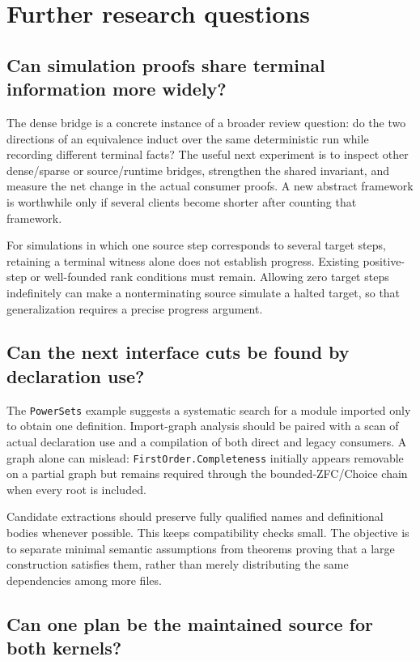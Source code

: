 \documentclass[11pt]{article}
\begin{document}
\section{Further research questions}

\subsection{Can simulation proofs share terminal information more widely?}

The dense bridge is a concrete instance of a broader review question: do the two directions of an equivalence induct over the same deterministic run while recording different terminal facts? The useful next experiment is to inspect other dense/sparse or source/runtime bridges, strengthen the shared invariant, and measure the net change in the actual consumer proofs. A new abstract framework is worthwhile only if several clients become shorter after counting that framework.

For simulations in which one source step corresponds to several target steps, retaining a terminal witness alone does not establish progress. Existing positive-step or well-founded rank conditions must remain. Allowing zero target steps indefinitely can make a nonterminating source simulate a halted target, so that generalization requires a precise progress argument.

\subsection{Can the next interface cuts be found by declaration use?}

The \texttt{PowerSets} example suggests a systematic search for a module imported only to obtain one definition. Import-graph analysis should be paired with a scan of actual declaration use and a compilation of both direct and legacy consumers. A graph alone can mislead: \texttt{FirstOrder.Completeness} initially appears removable on a partial graph but remains required through the bounded-ZFC/Choice chain when every root is included.

Candidate extractions should preserve fully qualified names and definitional bodies whenever possible. This keeps compatibility checks small. The objective is to separate minimal semantic assumptions from theorems proving that a large construction satisfies them, rather than merely distributing the same dependencies among more files.

\subsection{Can one plan be the maintained source for both kernels?}
\end{document}
